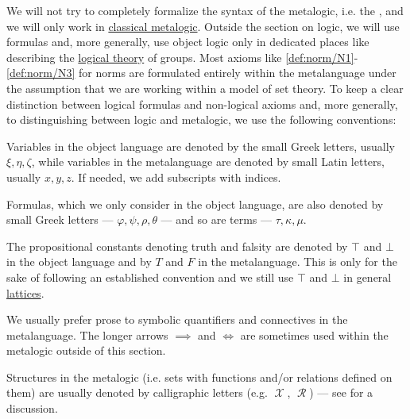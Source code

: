 \begin{remark}\label{rem:mathematical_logic_conventions}
  We will not try to completely formalize the syntax of the metalogic, i.e. the , and we will only work in \hyperref[def:propositional_axiomatic_derivation_system]{classical metalogic}. Outside the section on logic, we will use formulas and, more generally, use object logic only in dedicated places like  describing the \hyperref[def:first_order_theory]{logical theory} of groups. Most axioms like \ref{def:norm/N1}-\ref{def:norm/N3} for norms are formulated entirely within the metalanguage under the assumption that we are working within a model of set theory. To keep a clear distinction between logical formulas and non-logical axioms and, more generally, to distinguishing between logic and metalogic, we use the following conventions:

  \begin{thmenum}
     Variables in the object language are denoted by the small Greek letters, usually \( \xi, \eta, \zeta \), while variables in the metalanguage are denoted by small Latin letters, usually \( x, y, z \). If needed, we add subscripts with indices.

     Formulas, which we only consider in the object language, are also denoted by small Greek letters --- \( \varphi, \psi, \rho, \theta \) --- and so are terms --- \( \tau, \kappa, \mu \).

     The propositional constants denoting truth and falsity are denoted by \( \top \) and \( \bot \) in the object language and by \( T \) and \( F \) in the metalanguage. This is only for the sake of following an established convention and we still use \( \top \) and \( \bot \) in general \hyperref[def:lattice]{lattices}.

     We usually prefer prose to symbolic quantifiers and connectives in the metalanguage. The longer arrows \( \implies \) and \( \iff \) are sometimes used within the metalogic outside of this section.

     Structures in the metalogic (i.e. sets with functions and/or relations defined on them) are usually denoted by calligraphic letters (e.g. \( \mscrX \), \( \mscrR \)) --- see  for a discussion.


\end{thmenum}
\end{remark}

